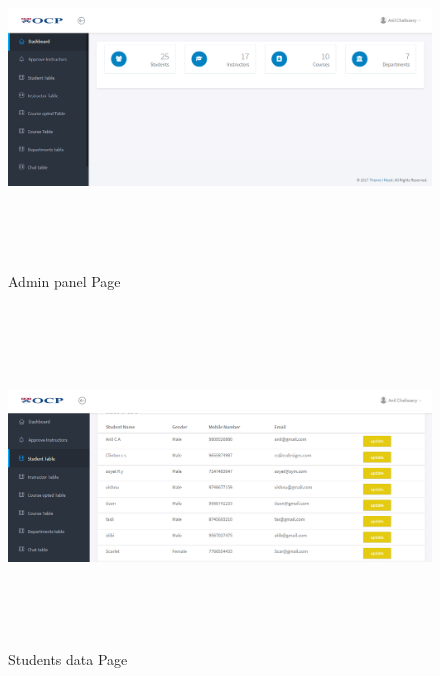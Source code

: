 \begin{figure}[!h]
	\begin{center}
		\includegraphics[height=9cm,width=16cm]{adminpanel.png}
	\end{center}
\caption{Admin panel Page}
\end{figure}

\begin{figure}[!h]
	\begin{center}
		\includegraphics[height=9cm,width=16cm]{studentstable.png}
	\end{center}
\caption{Students data Page}
\end{figure}

